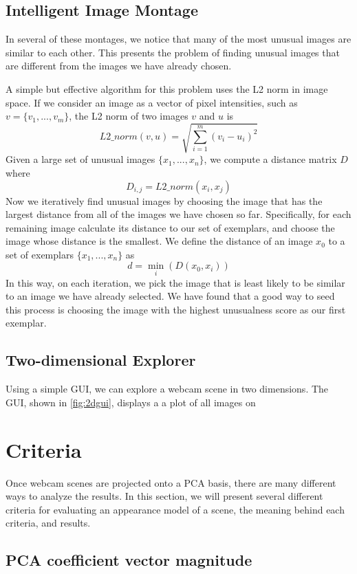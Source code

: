 \subsection{Intelligent Image Montage}

In several of these montages, we notice that many of the most unusual images are similar to each other.  This presents the problem of finding unusual images that are different from the images we have already chosen.

A simple but effective algorithm for this problem uses the L2 norm in image space.  If we consider an image as a vector of pixel intensities, such as $v = \{v_1, ..., v_m\}$, the L2 norm of two images $v$ and $u$ is $$L2\_norm(v,u) = \sqrt{\sum_{i=1}^m{(v_i-u_i)^2}}$$  Given a large set of unusual images $\{x_1, ..., x_n\}$, we compute a distance matrix $D$ where $$D_{i,j} = L2\_norm(x_i, x_j)$$  Now we iteratively find unusual images by choosing the image that has the largest distance from all of the images we have chosen so far.  Specifically, for each remaining image calculate its distance to our set of exemplars, and choose the image whose distance is the smallest.  We define the distance of an image $x_0$ to a set of exemplars $\{x_1, ..., x_n\}$ as $$d = \min_i(D(x_0, x_i))$$In this way, on each iteration, we pick the image that is least likely to be similar to an image we have already selected.  We have found that a good way to seed this process is choosing the image with the highest unusualness score as our first exemplar.

\subsection{Two-dimensional Explorer}


Using a simple GUI, we can explore a webcam scene in two dimensions.  The GUI, shown in \ref{fig:2dgui}, displays a a plot of all images on


\section{Criteria}

Once webcam scenes are projected onto a PCA basis, there are many different ways to analyze the results.
In this section, we will present several different criteria for evaluating an appearance model of a scene,
the meaning behind each criteria, and results.

\subsection{PCA coefficient vector magnitude}

